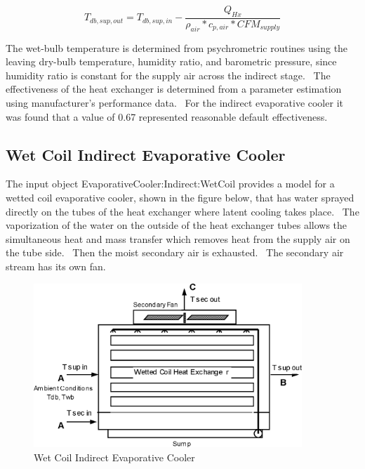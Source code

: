 \begin{equation}
T_{db,sup,out} = T_{db,sup,in} - \frac{{{Q_{Hx}}}}{{{\rho_{air}}*{c_{p,air}}*CF{M_{supply}}}}
\end{equation}

The wet-bulb temperature is determined from psychrometric routines using the leaving dry-bulb temperature, humidity ratio, and barometric pressure, since humidity ratio is constant for the supply air across the indirect stage.~ The effectiveness of the heat exchanger is determined from a parameter estimation using manufacturer's performance data.~ For the indirect evaporative cooler it was found that a value of 0.67 represented reasonable default effectiveness.

\subsection{Wet Coil Indirect Evaporative Cooler}\label{wet-coil-indirect-evaporative-cooler}

The input object EvaporativeCooler:Indirect:WetCoil provides a model for a wetted coil evaporative cooler, shown in the figure below, that has water sprayed directly on the tubes of the heat exchanger where latent cooling takes place.~ The vaporization of the water on the outside of the heat exchanger tubes allows the simultaneous heat and mass transfer which removes heat from the supply air on the tube side.~ Then the moist secondary air is exhausted.~ The secondary air stream has its own fan.

\begin{figure}[hbtp] %
\centering
\includegraphics[width=0.9\textwidth, height=0.9\textheight, keepaspectratio=true]{media/image4797.png}
\caption{Wet Coil Indirect Evaporative Cooler \protect \label{fig:wet-coil-indirect-evaporative-cooler}}
\end{figure}

